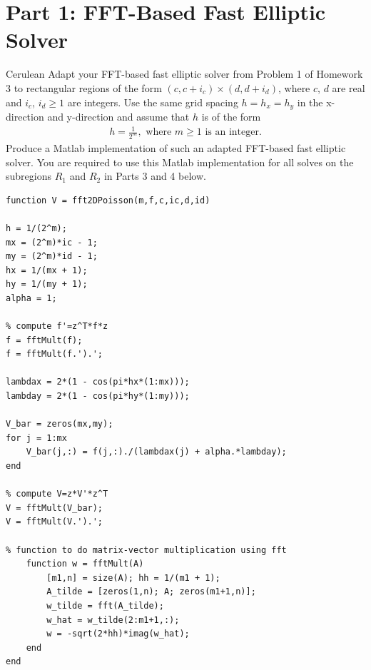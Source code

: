 \documentclass[12pt]{article}
\begin{document}
\section{Part 1: FFT-Based Fast Elliptic Solver} 
\begin{mybox}{Cerulean}{}
Adapt your FFT-based fast elliptic solver from Problem 1 of Homework 3 to rectangular regions of the form $(c,c+i_c)\times (d,d+i_d)$, where $c$, $d$ are real and $i_c$, $i_d \geq 1$ are integers.  Use the same grid spacing $h = h_x = h_y$ in the x-direction and y-direction and assume that $h$ is of the form
\begin{align*}
h = \frac{1}{2^m}, \text{ where } m\geq 1 \text{ is an integer.} \tag{3}
\end{align*}
Produce a Matlab implementation of such an adapted FFT-based fast elliptic solver.  You are required to use this Matlab implementation for all solves on the subregions $R_1$ and $R_2$ in Parts 3 and 4 below.
\end{mybox}
\lstset{language=matlab,frame=single}
\begin{lstlisting}[caption= FFT-Based Fast Elliptic Solver ]
function V = fft2DPoisson(m,f,c,ic,d,id)

h = 1/(2^m);
mx = (2^m)*ic - 1;
my = (2^m)*id - 1;
hx = 1/(mx + 1);
hy = 1/(my + 1);
alpha = 1;

% compute f'=z^T*f*z
f = fftMult(f); 
f = fftMult(f.').'; 

lambdax = 2*(1 - cos(pi*hx*(1:mx)));
lambday = 2*(1 - cos(pi*hy*(1:my)));

V_bar = zeros(mx,my);
for j = 1:mx
    V_bar(j,:) = f(j,:)./(lambdax(j) + alpha.*lambday);
end

% compute V=z*V'*z^T
V = fftMult(V_bar); 
V = fftMult(V.').'; 

% function to do matrix-vector multiplication using fft
    function w = fftMult(A)
        [m1,n] = size(A); hh = 1/(m1 + 1);
        A_tilde = [zeros(1,n); A; zeros(m1+1,n)];
        w_tilde = fft(A_tilde);
        w_hat = w_tilde(2:m1+1,:);
        w = -sqrt(2*hh)*imag(w_hat);
    end
end
\end{lstlisting}






\newpage
\end{document}
